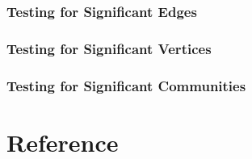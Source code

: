 \documentclass[letterpaper,10pt,english]{jupyterBook}
\begin{document}
\section{Testing for Significant Edges}
\label{\detokenize{applications/ch10/significant-edges:testing-for-significant-edges}}\label{\detokenize{applications/ch10/significant-edges::doc}}

\section{Testing for Significant Vertices}
\label{\detokenize{applications/ch10/significant-vertices:testing-for-significant-vertices}}\label{\detokenize{applications/ch10/significant-vertices::doc}}

\section{Testing for Significant Communities}
\label{\detokenize{applications/ch10/significant-communities:testing-for-significant-communities}}\label{\detokenize{applications/ch10/significant-communities::doc}}

\part{Reference}







\renewcommand{\indexname}{Index}
\printindex
\end{document}
